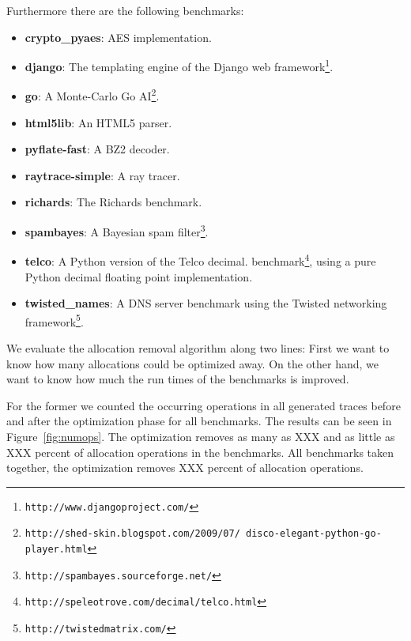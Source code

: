 \documentclass{sigplanconf}
\begin{document}
Furthermore there are the following benchmarks:
\begin{itemize}
    \item \textbf{crypto\_pyaes}: AES implementation.
    \item \textbf{django}: The templating engine of the Django web
    framework\footnote{\texttt{http://www.djangoproject.com/}}.
    \item \textbf{go}: A Monte-Carlo Go
    AI\footnote{\texttt{http://shed-skin.blogspot.com/2009/07/ disco-elegant-python-go-player.html}}.
    \item \textbf{html5lib}: An HTML5 parser.
    \item \textbf{pyflate-fast}: A BZ2 decoder.
    \item \textbf{raytrace-simple}: A ray tracer.
    \item \textbf{richards}: The Richards benchmark.
    \item \textbf{spambayes}: A Bayesian spam filter\footnote{\texttt{http://spambayes.sourceforge.net/}}.
    \item \textbf{telco}: A Python version of the Telco decimal.
    benchmark\footnote{\texttt{http://speleotrove.com/decimal/telco.html}},
    using a pure Python decimal floating point implementation.
    \item \textbf{twisted\_names}: A DNS server benchmark using the Twisted networking
    framework\footnote{\texttt{http://twistedmatrix.com/}}.
\end{itemize}

We evaluate the allocation removal algorithm along two lines: First we want to
know how many allocations could be optimized away. On the other hand, we want
to know how much the run times of the benchmarks is improved.

For the former we counted the occurring operations in all generated traces
before and after the optimization phase for all benchmarks. The results can be
seen in Figure~\ref{fig:numops}. The optimization removes as many as XXX and as
little as XXX percent of allocation operations in the benchmarks. All benchmarks
taken together, the optimization removes XXX percent of allocation operations.
\end{document}
